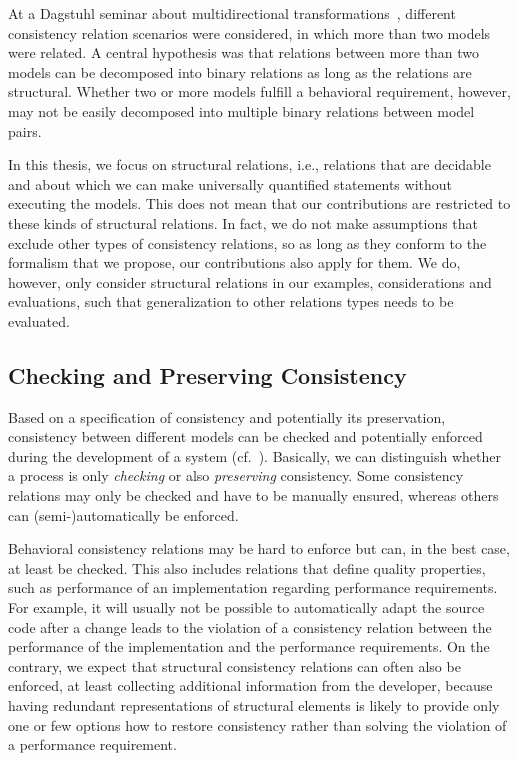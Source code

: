 At a Dagstuhl seminar about multidirectional transformations~\cite{cleve2019dagstuhl}, different consistency relation scenarios were considered, in which more than two models were related.
A central hypothesis was that relations between more than two models can be decomposed into binary relations as long as the relations are structural.
Whether two or more models fulfill a behavioral requirement, however, may not be easily decomposed into multiple binary relations between model pairs.

In this thesis, we focus on structural relations, i.e., relations that are decidable and about which we can make universally quantified statements without executing the models.
This does not mean that our contributions are restricted to these kinds of structural relations.
In fact, we do not make assumptions that exclude other types of consistency relations, so as long as they conform to the formalism that we propose, our contributions also apply for them.
We do, however, only consider structural relations in our examples, considerations and evaluations, such that generalization to other relations types needs to be evaluated.


\subsection{Checking and Preserving Consistency}
\label{chap:networks:notions:check_preserve}

Based on a specification of consistency and potentially its preservation, consistency between different models can be checked and potentially enforced during the development of a system (cf.~\cite{qvt}).
Basically, we can distinguish whether a process is only \emph{checking} or also \emph{preserving} consistency.
Some consistency relations may only be checked and have to be manually ensured, whereas others can (semi-)automatically be enforced.

Behavioral consistency relations may be hard to enforce but can, in the best case, at least be checked.
This also includes relations that define quality properties, such as performance of an implementation regarding performance requirements.
For example, it will usually not be possible to automatically adapt the source code after a change leads to the violation of a consistency relation between the performance of the implementation and the performance requirements.
On the contrary, we expect that structural consistency relations can often also be enforced, at least collecting additional information from the developer, because having redundant representations of structural elements is likely to provide only one or few options how to restore consistency rather than solving the violation of a performance requirement.

